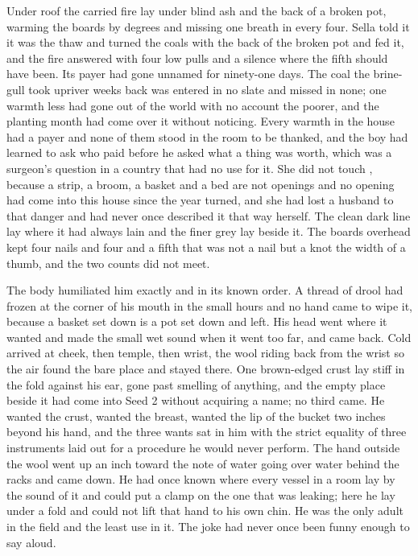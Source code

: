 Under  roof the carried fire lay under blind ash and the back of a broken pot, warming the boards by degrees and missing one breath in every four. Sella told it it was the thaw and turned the coals with the back of the broken pot and fed it, and the fire answered with four low pulls and a silence where the fifth should have been. Its payer had gone unnamed for ninety-one days. The coal the brine-gull took upriver weeks back was entered in no slate and missed in none; one warmth less had gone out of the world with no account the poorer, and the planting month had come over it without noticing. Every warmth in the house had a payer and none of them stood in the room to be thanked, and the boy had learned to ask who paid before he asked what a thing was worth, which was a surgeon's question in a country that had no use for it. She did not touch , because a strip, a broom, a basket and a bed are not openings and no opening had come into this house since the year turned, and she had lost a husband to that danger and had never once described it that way herself. The clean dark line lay where it had always lain and the finer grey lay beside it. The boards overhead kept four nails and four and a fifth that was not a nail but a knot the width of a thumb, and the two counts did not meet.

The body humiliated him exactly and in its known order. A thread of drool had frozen at the corner of his mouth in the small hours and no hand came to wipe it, because a basket set down is a pot set down and left. His head went where it wanted and made the small wet sound when it went too far, and came back. Cold arrived at cheek, then temple, then wrist, the wool riding back from the wrist so the air found the bare place and stayed there. One brown-edged crust lay stiff in the fold against his ear, gone past smelling of anything, and the empty place beside it had come into Seed 2 without acquiring a name; no third came. He wanted the crust, wanted the breast, wanted the lip of the  bucket two inches beyond his hand, and the three wants sat in him with the strict equality of three instruments laid out for a procedure he would never perform. The hand outside the wool went up an inch toward the note of water going over water behind the racks and came down. He had once known where every vessel in a room lay by the sound of it and could put a clamp on the one that was leaking; here he lay under a fold and could not lift that hand to his own chin. He was the only adult in the field and the least use in it. The joke had never once been funny enough to say aloud.

